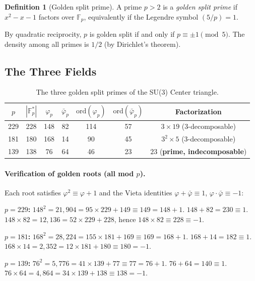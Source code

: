 \documentclass[12pt,oneside]{article}
\theoremstyle{principia}
\theoremstyle{definition}
\newtheorem{definition}[theorem]{Definition}
\theoremstyle{remark}
\begin{document}
\begin{definition}[Golden split prime]
\label{def:golden}
A prime $p > 2$ is a \emph{golden split prime} if $x^2 - x - 1$
factors over $\mathbb{F}_p$, equivalently if the Legendre symbol
$(5/p) = 1$.
\end{definition}

By quadratic reciprocity, $p$ is golden split if and only if
$p \equiv \pm 1 \pmod{5}$. The density among all primes is $1/2$
(by Dirichlet's theorem).

\subsection{The Three Fields}

\begin{table}[h]
\centering
\caption{The three golden split primes of the SU(3) Center triangle.}
\label{tab:fields}
\begin{tabular}{@{}ccccccc@{}}
\toprule
$p$ & $|{\mathbb{F}_p^*}|$ & $\varphi_p$ & $\bar\varphi_p$
    & $\mathrm{ord}(\varphi_p)$ & $\mathrm{ord}(\bar\varphi_p)$
    & Factorization \\
\midrule
229 & 228 & 148 & 82  & 114 & 57  & $3 \times 19$ (3-decomposable) \\
181 & 180 & 168 & 14  &  90 & 45  & $3^2 \times 5$ (3-decomposable) \\
139 & 138 &  76 & 64  &  46 & 23  & $23$ (\textbf{prime, indecomposable}) \\
\bottomrule
\end{tabular}
\end{table}

\paragraph{Verification of golden roots (all mod $p$).}
Each root satisfies $\varphi^2 \equiv \varphi + 1$ and the Vieta identities
$\varphi + \bar\varphi \equiv 1$, $\varphi \cdot \bar\varphi \equiv -1$:

\medskip
\noindent\textbf{$p = 229$:}
$148^2 = 21{,}904 = 95 \times 229 + 149 \equiv 149 = 148 + 1$.
$148 + 82 = 230 \equiv 1$.
$148 \times 82 = 12{,}136 = 52 \times 229 + 228$,
hence $148 \times 82 \equiv 228 \equiv -1$.

\medskip
\noindent\textbf{$p = 181$:}
$168^2 = 28{,}224 = 155 \times 181 + 169 \equiv 169 = 168 + 1$.
$168 + 14 = 182 \equiv 1$.
$168 \times 14 = 2{,}352 = 12 \times 181 + 180 \equiv 180 = -1$.

\medskip
\noindent\textbf{$p = 139$:}
$76^2 = 5{,}776 = 41 \times 139 + 77 \equiv 77 = 76 + 1$.
$76 + 64 = 140 \equiv 1$.
$76 \times 64 = 4{,}864 = 34 \times 139 + 138 \equiv 138 = -1$.
\end{document}

